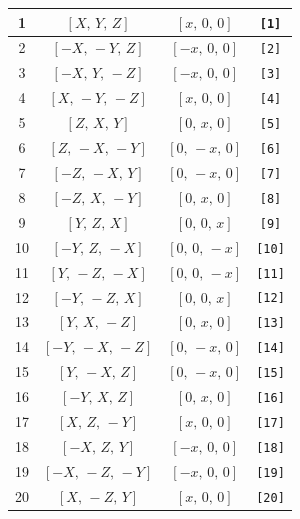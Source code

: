 \documentclass[fleqn,8pt]{jsarticle}
\begin{document}
\begin{longtable}{cccc}
1 & $\left[ X,\, Y,\, Z \right]$ & $\left[ x,\, 0,\, 0 \right]$ & {\tt [1]} \\ \hline
2 & $\left[ - X,\, - Y,\, Z \right]$ & $\left[ - x,\, 0,\, 0 \right]$ & {\tt [2]} \\ \hline
3 & $\left[ - X,\, Y,\, - Z \right]$ & $\left[ - x,\, 0,\, 0 \right]$ & {\tt [3]} \\ \hline
4 & $\left[ X,\, - Y,\, - Z \right]$ & $\left[ x,\, 0,\, 0 \right]$ & {\tt [4]} \\ \hline
5 & $\left[ Z,\, X,\, Y \right]$ & $\left[ 0,\, x,\, 0 \right]$ & {\tt [5]} \\ \hline
6 & $\left[ Z,\, - X,\, - Y \right]$ & $\left[ 0,\, - x,\, 0 \right]$ & {\tt [6]} \\ \hline
7 & $\left[ - Z,\, - X,\, Y \right]$ & $\left[ 0,\, - x,\, 0 \right]$ & {\tt [7]} \\ \hline
8 & $\left[ - Z,\, X,\, - Y \right]$ & $\left[ 0,\, x,\, 0 \right]$ & {\tt [8]} \\ \hline
9 & $\left[ Y,\, Z,\, X \right]$ & $\left[ 0,\, 0,\, x \right]$ & {\tt [9]} \\ \hline
10 & $\left[ - Y,\, Z,\, - X \right]$ & $\left[ 0,\, 0,\, - x \right]$ & {\tt [10]} \\ \hline
11 & $\left[ Y,\, - Z,\, - X \right]$ & $\left[ 0,\, 0,\, - x \right]$ & {\tt [11]} \\ \hline
12 & $\left[ - Y,\, - Z,\, X \right]$ & $\left[ 0,\, 0,\, x \right]$ & {\tt [12]} \\ \hline
13 & $\left[ Y,\, X,\, - Z \right]$ & $\left[ 0,\, x,\, 0 \right]$ & {\tt [13]} \\ \hline
14 & $\left[ - Y,\, - X,\, - Z \right]$ & $\left[ 0,\, - x,\, 0 \right]$ & {\tt [14]} \\ \hline
15 & $\left[ Y,\, - X,\, Z \right]$ & $\left[ 0,\, - x,\, 0 \right]$ & {\tt [15]} \\ \hline
16 & $\left[ - Y,\, X,\, Z \right]$ & $\left[ 0,\, x,\, 0 \right]$ & {\tt [16]} \\ \hline
17 & $\left[ X,\, Z,\, - Y \right]$ & $\left[ x,\, 0,\, 0 \right]$ & {\tt [17]} \\ \hline
18 & $\left[ - X,\, Z,\, Y \right]$ & $\left[ - x,\, 0,\, 0 \right]$ & {\tt [18]} \\ \hline
19 & $\left[ - X,\, - Z,\, - Y \right]$ & $\left[ - x,\, 0,\, 0 \right]$ & {\tt [19]} \\ \hline
20 & $\left[ X,\, - Z,\, Y \right]$ & $\left[ x,\, 0,\, 0 \right]$ & {\tt [20]} \\ \hline

\end{longtable}
\end{document}
